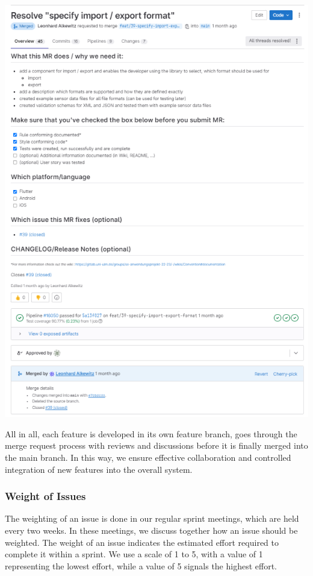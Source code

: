 \documentclass[12pt]{article}
\begin{document}
     \begin{minipage}[t]{0.55\textwidth}
        \vspace{-\baselineskip}
        \includegraphics[width=\textwidth]{mr.png}
    \end{minipage}
    
    All in all, each feature is developed in its own feature branch, goes through the merge request process with reviews and discussions before it is finally merged into the main branch. In this way, we ensure effective collaboration and controlled integration of new features into the overall system.
\subsubsection{Weight of Issues}
The weighting of an issue is done in our regular sprint meetings, which are held every two weeks. In these meetings, we discuss together how an issue should be weighted. The weight of an issue indicates the estimated effort required to complete it within a sprint. We use a scale of 1 to 5, with a value of 1 representing the lowest effort, while a value of 5 signals the highest effort.
\end{document}
